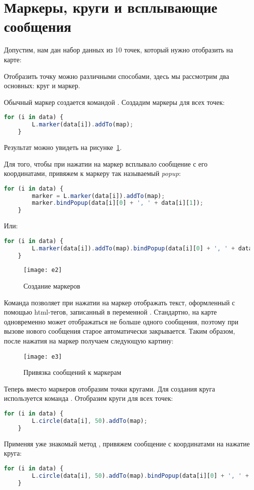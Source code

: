 \section{Маркеры, круги и всплывающие сообщения}
Допустим, нам дан набор данных из 10 точек, который нужно отобразить на карте:


Отобразить точку можно различными способами, здесь мы рассмотрим два 
основных: круг и маркер.

Обычный маркер создается командой . 
Создадим маркеры для всех точек:
\begin{lstlisting}[language=js]
    for (i in data) {
        L.marker(data[i]).addTo(map);
    }
\end{lstlisting}

Результат можно увидеть на рисунке~\ref{pic:e2}.

Для того, чтобы при нажатии на маркер всплывало сообщение с его координатами, 
привяжем к маркеру так называемый \emph{popup}:
\begin{lstlisting}[language=js]
    for (i in data) {
        marker = L.marker(data[i]).addTo(map);
        marker.bindPopup(data[i][0] + ', ' + data[i][1]);
    }
\end{lstlisting}
Или:
\begin{lstlisting}[language=js]
    for (i in data) {
        L.marker(data[i]).addTo(map).bindPopup(data[i][0] + ', ' + data[i][1]);
    }
\end{lstlisting}

\begin{figure}[h!]
    \center
    \texttt{[image: e2]}
    \caption{Создание маркеров}
    \label{pic:e2}
\end{figure}

Команда  позволяет при нажатии на маркер отображать 
текст, оформленный с помощью html-тегов, записанный в переменной 
. Стандартно, на карте одновременно может отображаться не 
больше одного сообщения, поэтому при вызове нового сообщения старое 
автоматически закрывается. Таким образом, после нажатия на маркер получаем 
следующую картину: 
\begin{figure}[ht!]
    \center
    \texttt{[image: e3]}
    \caption{Привязка сообщений к маркерам}
\end{figure}

Теперь вместо маркеров отобразим точки кругами. Для создания круга 
используется команда . Отобразим 
круги для всех точек:
\begin{lstlisting}[language=js]
    for (i in data) {
        L.circle(data[i], 50).addTo(map);
    }
\end{lstlisting}
Применяя уже знакомый метод , привяжем сообщение с 
координатами на нажатие круга:
\begin{lstlisting}[language=js]
    for (i in data) {
        L.circle(data[i], 50).addTo(map).bindPopup(data[i][0] + ', ' + data[i][1]);
    }
\end{lstlisting}

